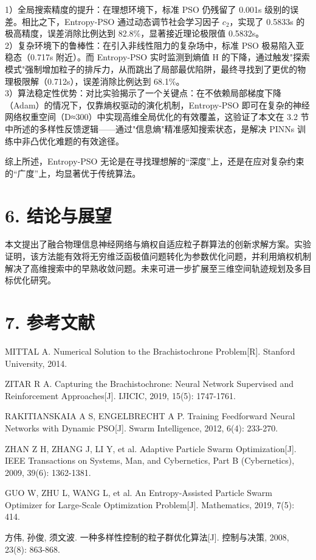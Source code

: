 \documentclass[twocolumn, 12pt]{article} %
\newcommand{\wuhao}{\fontsize{10.5pt}{12.6pt}\selectfont} %
\begin{document}
	1）全局搜索精度的提升：在理想环境下，标准 PSO 仍残留了 0.001s 级别的误差。相比之下，Entropy-PSO 通过动态调节社会学习因子 $c_2$，实现了 0.5833s 的极高精度，误差消除比例达到 82.8\%，显著接近理论极限值 0.5832s。\\
	2）复杂环境下的鲁棒性：在引入非线性阻力的复杂场中，标准 PSO 极易陷入亚稳态（0.717s 附近）。而 Entropy-PSO 实时监测到熵值 H 的下降，通过触发"探索模式"强制增加粒子的排斥力，从而跳出了局部最优陷阱，最终寻找到了更优的物理极限解（0.712s），误差消除比例达到 68.1\%。\\
	3）算法稳定性优势：对比实验揭示了一个关键点：在不依赖局部梯度下降（Adam）的情况下，仅靠熵权驱动的演化机制，Entropy-PSO 即可在复杂的神经网络权重空间（D≈300）中实现高维全局优化的有效覆盖，这验证了本文在 3.2 节中所述的多样性反馈逻辑——通过"信息熵"精准感知搜索状态，是解决 PINNs 训练中非凸优化难题的有效途径。
	
	综上所述，Entropy-PSO 无论是在寻找理想解的“深度”上，还是在应对复杂约束的“广度”上，均显著优于传统算法。
	
	\section{6. 结论与展望}
	本文提出了融合物理信息神经网络与熵权自适应粒子群算法的创新求解方案。实验证明，该方法能有效将无穷维泛函极值问题转化为参数优化问题，并利用熵权机制解决了高维搜索中的早熟收敛问题。未来可进一步扩展至三维空间轨迹规划及多目标优化研究。
	
	\section{7. 参考文献}
	\wuhao
	\noindent [1] MITTAL A. Numerical Solution to the Brachistochrone Problem[R]. Stanford University, 2014. \par
	\noindent [2] ZITAR R A. Capturing the Brachistochrone: Neural Network Supervised and Reinforcement Approaches[J]. IJICIC, 2019, 15(5): 1747-1761. \par
	\noindent [3] RAKITIANSKAIA A S, ENGELBRECHT A P. Training Feedforward Neural Networks with Dynamic PSO[J]. Swarm Intelligence, 2012, 6(4): 233-270. \par
	\noindent [4] ZHAN Z H, ZHANG J, LI Y, et al. Adaptive Particle Swarm Optimization[J]. IEEE Transactions on Systems, Man, and Cybernetics, Part B (Cybernetics), 2009, 39(6): 1362-1381. \par
	\noindent [5] GUO W, ZHU L, WANG L, et al. An Entropy-Assisted Particle Swarm Optimizer for Large-Scale Optimization Problem[J]. Mathematics, 2019, 7(5): 414. \par
	\noindent [6] 方伟, 孙俊, 须文波. 一种多样性控制的粒子群优化算法[J]. 控制与决策, 2008, 23(8): 863-868. \par
	
\end{document}

